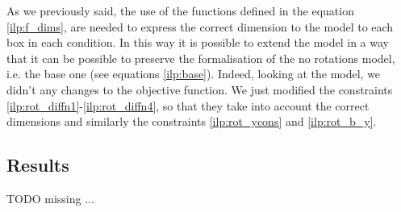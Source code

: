     As we previously said, the use of the functions defined in the equation \ref{ilp:f_dims}, are 
    needed to express the correct dimension to the model to each box in each condition. In this way 
    it is possible to extend the model in a way that it can be possible to preserve the 
    formalisation of the no rotations model, i.e. the base one (see equations \ref{ilp:base}).
    Indeed, looking at the model, we didn't any changes to the objective function. We just modified
    the constraints \ref{ilp:rot_diffn1}-\ref{ilp:rot_diffn4}, so that they take into account the 
    correct dimensions and similarly the constraints \ref{ilp:rot_ycons} and \ref{ilp:rot_b_y}.



\subsection{Results}
    \colorbox{BurntOrange}{TODO missing ...}
